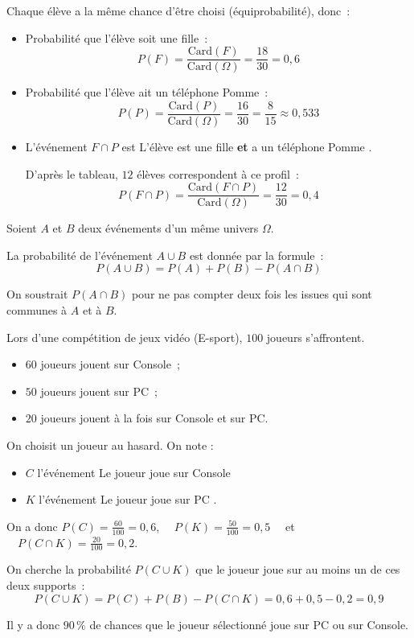 \begin{ex}
	Chaque élève a la même chance d'être choisi (équiprobabilité), donc~:
	\begin{itemize}
		\item Probabilité que l'élève soit une fille~:
		      \[ P(F) = \dfrac{\text{Card}(F)}{\text{Card}(\Omega)} = \dfrac{18}{30} = 0{,}6 \]
		\item Probabilité que l'élève ait un téléphone Pomme~:
		      \[ P(P) = \dfrac{\text{Card}(P)}{\text{Card}(\Omega)} = \dfrac{16}{30} = \dfrac{8}{15} \approx 0{,}533 \]
		\item L'événement $F \cap P$ est \og L'élève est une fille \textbf{et} a un téléphone Pomme \fg{}.

		      D'après le tableau, $12$ élèves correspondent à ce profil~:
		      \[ P(F \cap P) = \dfrac{\text{Card}(F \cap P)}{\text{Card}(\Omega)} = \dfrac{12}{30} = 0{,}4 \]
	\end{itemize}
\end{ex}

\begin{prop}
	Soient $A$ et $B$ deux événements d'un même univers $\Omega$.

	La probabilité de l'événement $A \cup B$ est donnée par la formule~:
	\[ P(A \cup B) = P(A) + P(B) - P(A \cap B) \]
\end{prop}

\begin{rem}
	On soustrait $P(A \cap B)$ pour ne pas compter deux fois les issues qui sont communes à $A$ et à $B$.
\end{rem}

\begin{ex}
	Lors d'une compétition de jeux vidéo (E-sport), $100$ joueurs s'affrontent.
	\begin{itemize}
		\item $60$ joueurs jouent sur Console~;
		\item $50$ joueurs jouent sur PC~;
		\item $20$ joueurs jouent à la fois sur Console et sur PC.
	\end{itemize}

	On choisit un joueur au hasard. On note :
	\begin{itemize}
		\item $C$ l'événement \og Le joueur joue sur Console \fg{}
		\item $K$ l'événement \og Le joueur joue sur PC \fg{}.
	\end{itemize}

	On a donc $P(C) = \frac{60}{100} = 0{,}6$, $\quad P(K) = \frac{50}{100} = 0{,}5 \quad$ et $\quad P(C \cap K) = \frac{20}{100} = 0{,}2$.

	\ms

	On cherche la probabilité $P(C \cup K)$ que le joueur joue sur au moins un de ces deux supports~:
	\[ P(C \cup K) = P(C) + P(B) - P(C \cap K) = 0{,}6 + 0{,}5 - 0{,}2 = 0{,}9 \]

	Il y a donc $90\,\%$ de chances que le joueur sélectionné joue sur PC ou sur Console.
\end{ex}

